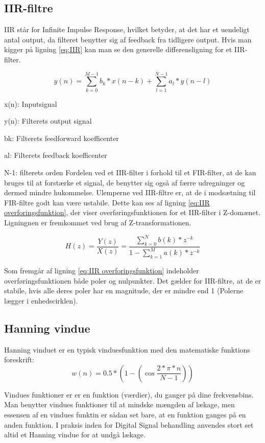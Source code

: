 \subsection{IIR-filtre}
IIR står for Infinite Impulse Response, hvilket betyder, at det har et uendeligt antal output, da filteret benytter sig af feedback fra tidligere output. Hvis man kigger på ligning \eqref{eq:IIR} kan man se den generelle differensligning for et IIR-filter.


\begin{equation}\label{eq:IIR}
{y(n)} = \displaystyle\sum_{k=0}^{M-1} {b_{k}*x(n-k)}+\displaystyle\sum_{l=1}^{N-1} {a_{l}*y(n-l)}
\end{equation}

x(n): Inputsignal

y(n): Filterets output signal

b{k}: Filterets feedforward koefficenter

a{l}: Filterets feedback koefficenter

N-1: filterets orden
\newline
\newline
Fordelen ved et IIR-filter i forhold til et FIR-filter, at de kan bruges til at forstærke et signal, de benytter sig også af færre udregninger og dermed mindre hukommelse. 
Ulemperne ved IIR-filtre er, at de i modsætning til FIR-filtre godt kan være ustabile. 
Dette kan ses af ligning \eqref{eq:IIR overforingsfunktion}, der viser overføringsfunktionen for et IIR-filter i Z-domænet. Ligningnen er fremkommet ved brug af Z-transformationen.

\begin{equation}\label{eq:IIR overforingsfunktion}
{H(z)} =\frac{Y(z)}{X(z)} =\frac{\displaystyle\sum_{k=0}^{N} {b(k)*z^{-k}}}{1-\displaystyle\sum_{k=1}^{M} {a(k)*z^{-k}}}
\end{equation}

Som fremgår af ligning \eqref{eq:IIR overforingsfunktion} indeholder overføringsfunktionen både poler og nulpunkter. Det gælder for IIR-filtre, at de er stabile, hvis alle deres poler har en magnitude, der er mindre end 1 (Polerne lægger i enhedscirklen).

\subsection{Hanning vindue}
Hanning vinduet er en typisk vinduesfunktion med den matematiske funktions foreskrift:
\begin{equation}\label{eq:Hanning}
{w(n)} ={0.5*(1-(\cos \frac{2*\pi*n}{N-1}))}
\end{equation}


Vindues funktioner er er en funktion (værdier), du ganger på dine frekvensbins. Man benytter vindues funktioner til at mindske mængden af lækage, men essensen af en vindues funktin er sådan set bare, at en funktion ganges på en anden funktion. I praksis inden for Digital Signal behandling anvendes stort set altid et Hanning vindue for at undgå lækage.

